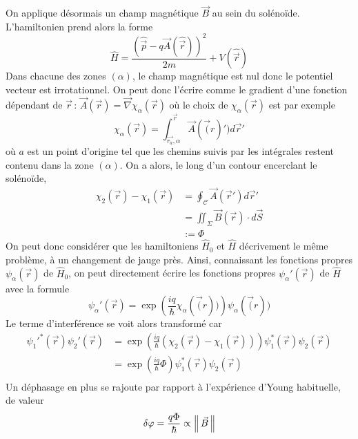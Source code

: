             On applique désormais un champ magnétique $\vec{B}$ au sein du solénoïde. L’hamiltonien prend alors la forme
            \[ \hat{H} = \frac{(\hat{\vec{p}} - q \vec{A}(\hat{\vec{r}}))^2}{2m} + V(\hat{\vec{r}}) \]   
            Dans chacune des zones $(\alpha)$, le champ magnétique est nul donc le potentiel vecteur est irrotationnel. On peut donc l’écrire comme le gradient d’une fonction dépendant de $\vec{r}$ : $\vec{A}(\vec{r}) = \vec{\nabla} \chi_{\alpha}(\vec{r})$ où le choix de $\chi_{\alpha}(\vec{r})$ est par exemple 
            \[ \chi_{\alpha}(\vec{r}) = \int_{\vec{r_{a}}, \alpha}^{\vec{r}} \vec{A}(\vec(r)') d\vec{r}' \]
            où $a$ est un point d’origine tel que les chemins suivis par les intégrales restent contenu dans la zone $(\alpha)$. On a alors, le long d’un contour encerclant le solénoïde,
            \begin{align*}
                \chi_2(\vec{r}) - \chi_1(\vec{r})
                &= \oint_{\mathcal{C}} \vec{A}(\vec{r}')d\vec{r}' \\
                &= \iint_{\Sigma} \vec{B}(\vec{r}) \cdot d\vec{S} \\
                &:= \Phi
            \end{align*}
            On peut donc considérer que les hamiltoniens $\hat{H}_0$ et $\hat{H}$ décrivement le même problème, à un changement de jauge près. Ainsi, connaissant les fonctions propres $\psi_{\alpha}(\vec{r})$ de $\hat{H}_0$, on peut directement écrire les fonctions propres $\psi_{\alpha}'(\vec{r})$ de $\hat{H}$ avec la formule 
            \[ \psi_{\alpha}'(\vec{r}) = \exp\left(\frac{iq}{\hbar}\chi_{\alpha}(\vec(r))\right)\psi_{\alpha}(\vec(r)) \]   
            Le terme d’interférence se voit alors transformé car 
            \begin{align*}
                \psi_{1}'^*(\vec{r}) \psi_{2}'(\vec{r})
                &= \exp\left(\frac{iq}{\hbar}(\chi_2(\vec{r}) - \chi_1(\vec{r}))\right)\psi_{1}^*(\vec{r}) \psi_2(\vec{r}) \\
                &= \exp\left(\frac{iq}{\hbar}\Phi\right)\psi_{1}^*(\vec{r}) \psi_2(\vec{r}) \\
            \end{align*}
            Un déphasage en plus se rajoute par rapport à l’expérience d’Young habituelle, de valeur 
            \[ \delta \varphi = \frac{q\Phi}{\hbar} \propto \left\lVert \, \vec{B} \, \right\rVert \]

    

        